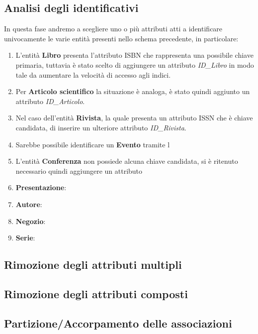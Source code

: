         \subsection{Analisi degli identificativi}
        In questa fase andremo a scegliere uno o più attributi atti a identificare univocamente
        le varie entità presenti nello schema precedente, in particolare:
            \begin{enumerate}
            \item L'entità \textbf{Libro} presenta l'attributo ISBN che rappresenta una possibile chiave primaria,
                  tuttavia è stato scelto di aggiungere un attributo \textit{ID\_Libro} in modo tale da aumentare
                  la velocità di accesso agli indici.
            \item Per \textbf{Articolo scientifico} la situazione è analoga, è stato quindi aggiunto un attributo
                  \textit{ID\_Articolo}.
            \item Nel caso dell'entità \textbf{Rivista}, la quale presenta un attributo ISSN che è chiave candidata,
                  di inserire un ulteriore attributo \textit{ID\_Rivista}.
            \item Sarebbe possibile identificare un \textbf{Evento} tramite l
            \item L'entità \textbf{Conferenza} non possiede alcuna chiave candidata, si è ritenuto necessario quindi aggiungere
                  un attributo 
            \item \textbf{Presentazione}: 
            \item \textbf{Autore}: 
            \item \textbf{Negozio}:
            \item \textbf{Serie}: 
            \end{enumerate}
        \subsection{Rimozione degli attributi multipli}
            
        \subsection{Rimozione degli attributi composti}
            
        \subsection{Partizione/Accorpamento delle associazioni}
            
